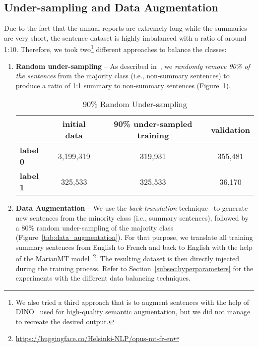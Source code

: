 \subsection{Under-sampling and Data Augmentation}\label{subsec:data_augmentation}
Due to the fact that the annual reports are extremely long while the summaries are very short, the sentence dataset is highly imbalanced with a ratio of around 1:10.
Therefore, we took two\footnote{
    We also tried a third approach that is to augment sentences with the help of DINO~\cite{schick2021generating} used for high-quality
    semantic augmentation, but we did not manage to recreate the desired output.
} different approaches to balance the classes:
\begin{enumerate}
    \item \textbf{Random under-sampling} -- As described in~\cite{weiss2013foundations, wongvorachan2023undersampling}, we \emph{randomly remove 90\% of the sentences} from the majority class (i.e., non-summary sentences) to produce a ratio of 1:1 summary to non-summary sentences (Figure~\ref{tab:random_under_sampling}).
    \begin{table}[ht]
        \centering
        \begin{tabular}{lccc}
            \toprule
                & \textbf{initial data} & \textbf{90\% under-sampled training} & \textbf{validation} \\
            \midrule
                \textbf{label 0} & 3,199,319 & 319,931 & 355,481 \\
                \textbf{label 1} & 325,533 & 325,533 & 36,170 \\
            \bottomrule
        \end{tabular}
        \caption{90\% Random Under-sampling}\label{tab:random_under_sampling}
    \end{table}
    \item \textbf{Data Augmentation} -- We use the \emph{back-translation} technique~\cite{hoang-etal-2018-iterative} to generate new sentences from the minority class (i.e., summary sentences), followed by a 80\% random under-sampling of the majority class (Figure~\ref{tab:data_augmentation}).
    For that purpose, we translate all training summary sentences from English to French and back to English with the help of the MarianMT model~\cite{junczysdowmunt2018marian}\footnote{\url{https://huggingface.co/Helsinki-NLP/opus-mt-fr-en}}.
    The resulting dataset is then directly injected during the training process.
    Refer to Section~\ref{subsec:hyperparameters} for the experiments with the different data balancing techniques.

\end{enumerate}
